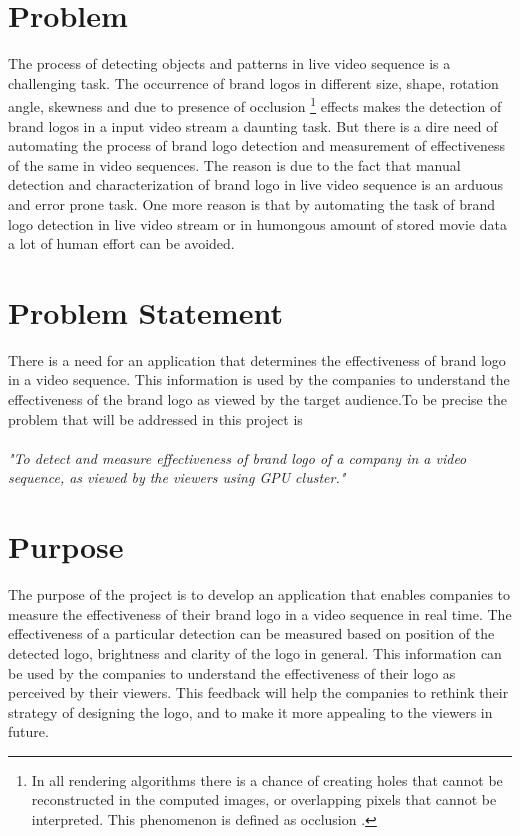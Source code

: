 \section{Problem}
The process of detecting objects and patterns in live video sequence is a challenging task. The occurrence of brand logos in different size, shape, rotation angle, skewness and due to presence of occlusion \footnote{In all rendering algorithms there is a chance of creating holes that cannot be reconstructed in the computed images, or overlapping pixels that cannot be interpreted. This phenomenon is defined as occlusion \cite{Depth6:online}.} effects makes the detection of brand logos in a input video stream a daunting task. But there is a dire need of automating the process of brand logo detection and measurement of effectiveness of the same in video sequences. The reason is due to the fact that manual detection and characterization of brand logo in live video sequence is an arduous and error prone task. One more reason is that by automating the task of brand logo detection in live video stream or in humongous amount of stored movie data a lot of human effort can be avoided.  


\section{Problem Statement}
There is a need for an application that determines the effectiveness of brand logo in a video sequence. This information is used by the companies to understand the effectiveness of the brand logo as viewed by the target audience.To be precise the problem that will be addressed in this project is \\ \\ 
{\it "To detect and measure effectiveness of brand logo of a company in a video sequence, as viewed by the viewers using GPU cluster."} 

\section{Purpose}
The purpose of the project is to develop an application that enables companies to measure the effectiveness of their brand logo in a video sequence in real time. The effectiveness of a particular detection can be measured based on position of the detected logo, brightness and clarity of the logo in general. This information can be used by the companies to understand the effectiveness of their logo as perceived by their viewers. This feedback will help the companies to rethink their strategy of designing the logo, and to make it more appealing to the viewers in future.

